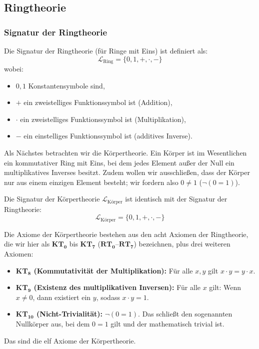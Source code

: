 \subsection{Ringtheorie}
\subsubsection{Signatur der Ringtheorie}

\begin{math-stroke}
Die Signatur der Ringtheorie (für Ringe mit Eins) ist definiert als:
\[ \mathcal{L}_{\text{Ring}} = \{0, 1, +, \cdot, -\} \]
wobei:
\begin{itemize}
    \item \textbf{$0, 1$} Konstantensymbole sind,
    \item \textbf{$+$} ein zweistelliges Funktionssymbol ist (Addition),
    \item \textbf{$\cdot$} ein zweistelliges Funktionssymbol ist (Multiplikation),
    \item \textbf{$-$} ein einstelliges Funktionssymbol ist (additives Inverse).
\end{itemize}
\end{math-stroke}

\begin{spoken-clean}[01:05:57 - 01:08:42]
Als Nächstes betrachten wir die Körpertheorie. Ein Körper ist im Wesentlichen ein kommutativer Ring mit Eins, bei dem jedes Element außer der Null ein multiplikatives Inverses besitzt. Zudem wollen wir ausschließen, dass der Körper nur aus einem einzigen Element besteht; wir fordern also $0 \neq 1$ ($\neg(0 = 1)$). 

Die Signatur der Körpertheorie $\mathcal{L}_{\text{Körper}}$ ist identisch mit der Signatur der Ringtheorie:
\[ \mathcal{L}_{\text{Körper}} = \{0, 1, +, \cdot, -\} \]

Die Axiome der Körpertheorie bestehen aus den acht Axiomen der Ringtheorie, die wir hier als $\mathbf{KT_0}$ bis $\mathbf{KT_7}$ ($\mathbf{RT_0}$--$\mathbf{RT_7}$) bezeichnen, plus drei weiteren Axiomen:
\begin{itemize}
    \item \textbf{KT$_{\mathbf{8}}$ (Kommutativität der Multiplikation):} Für alle $x, y$ gilt $x \cdot y = y \cdot x$.
    \item \textbf{KT$_{\mathbf{9}}$ (Existenz des multiplikativen Inversen):} Für alle $x$ gilt: Wenn $x \neq 0$, dann existiert ein $y$, sodass $x \cdot y = 1$.
    \item \textbf{KT$_{\mathbf{10}}$ (Nicht-Trivialität):} $\neg(0 = 1)$. Das schließt den sogenannten Nullkörper aus, bei dem $0 = 1$ gilt und der mathematisch trivial ist.
\end{itemize}

Das sind die elf Axiome der Körpertheorie.
\end{spoken-clean}

